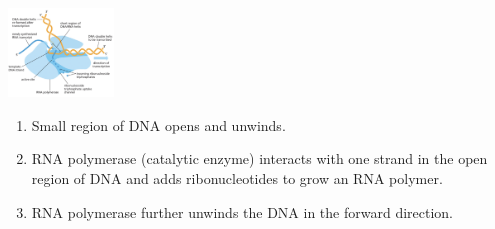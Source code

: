 \begin{minipage}{0.32\linewidth}
    \includegraphics[width=28mm]{src/Images/transcription.png}\\ 
\end{minipage}
\begin{minipage}{0.68\linewidth}
\begin{enumerate}
    \item Small region of DNA opens and unwinds.
    \item RNA polymerase (catalytic enzyme) interacts with one strand in the open region of DNA and adds ribonucleotides to grow an RNA polymer.
    \item RNA polymerase further unwinds the DNA in the forward direction.
\end{enumerate}
\end{minipage}